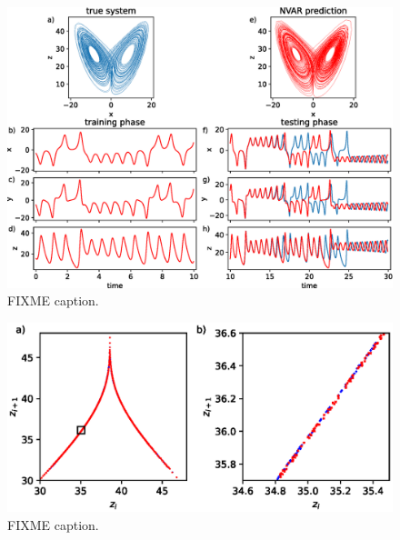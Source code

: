 \begin{figure}
  \includegraphics[width=\textwidth]{figures/nvar-predict-lorenz}
  \caption{FIXME caption.}
  \label{fig:nvar-predict-lorenz}
\end{figure}

\begin{figure}
  \includegraphics{figures/nvar-lorenz-rmap}
  \caption{FIXME caption.}
  \label{fig:nvar-lorenz-rmap}
\end{figure}

